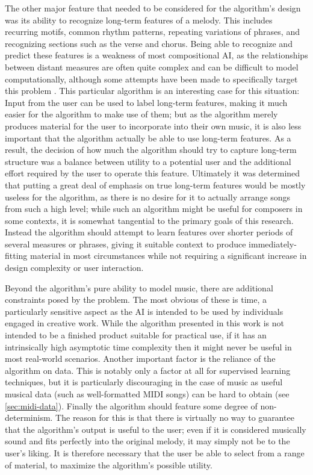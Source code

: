 \documentclass[ author={Stephen Livermore-Tozer},
				supervisor={Dr. Peter Flach},
				degree={MEng},
				title={Algorithmic Co-composition Using Machine Learning},
				subtitle={},
				type={research},
				year={2016} ]{dissertation}
\begin{document}
	The other major feature that needed to be considered for the algorithm's design was its ability to recognize long-term features of a melody. This includes recurring motifs, common rhythm patterns, repeating variations of phrases, and recognizing sections such as the verse and chorus. Being able to recognize and predict these features is a weakness of most compositional AI, as the relationships between distant measures are often quite complex and can be difficult to model computationally, although some attempts have been made to specifically target this problem \cite{tokui2000music,paiement2007generative}. This particular algorithm is an interesting case for this situation: Input from the user can be used to label long-term features, making it much easier for the algorithm to make use of them; but as the algorithm merely produces material for the user to incorporate into their own music, it is also less important that the algorithm actually be able to use long-term features. As a result, the decision of how much the algorithm should try to capture long-term structure was a balance between utility to a potential user and the additional effort required by the user to operate this feature. Ultimately it was determined that putting a great deal of emphasis on true long-term features would be mostly useless for the algorithm, as there is no desire for it to actually arrange songs from such a high level; while such an algorithm might be useful for composers in some contexts, it is somewhat tangential to the primary goals of this research. Instead the algorithm should attempt to learn features over shorter periods of several measures or phrases, giving it suitable context to produce immediately-fitting material in most circumstances while not requiring a significant increase in design complexity or user interaction. 
	
	Beyond the algorithm's pure ability to model music, there are additional constraints posed by the problem. The most obvious of these is time, a particularly sensitive aspect as the AI is intended to be used by individuals engaged in creative work. While the algorithm presented in this work is not intended to be a finished product suitable for practical use, if it has an intrinsically high asymptotic time complexity then it might never be useful in most real-world scenarios. Another important factor is the reliance of the algorithm on data. This is notably only a factor at all for supervised learning techniques, but it is particularly discouraging in the case of music as useful musical data (such as well-formatted MIDI songs) can be hard to obtain (see \ref{sec:midi-data}). Finally the algorithm should feature some degree of non-determinism. The reason for this is that there is virtually no way to guarantee that the algorithm's output is useful to the user; even if it is considered musically sound and fits perfectly into the original melody, it may simply not be to the user's liking. It is therefore necessary that the user be able to select from a range of material, to maximize the algorithm's possible utility.
\end{document}
